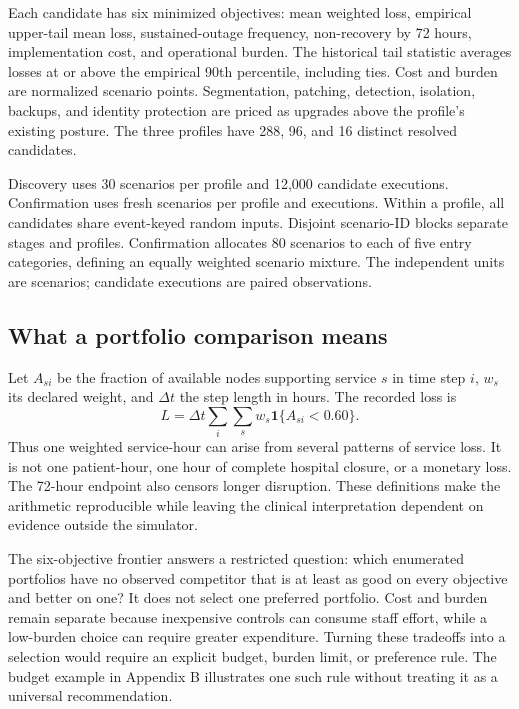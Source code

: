 \documentclass[conference,compsoc]{IEEEtran}
\begin{document}
Each candidate has six minimized objectives: mean weighted loss, empirical
upper-tail mean loss, sustained-outage frequency, non-recovery by 72 hours,
implementation cost, and operational burden. The historical tail statistic
averages losses at or above the empirical 90th percentile, including ties.
Cost and burden are normalized scenario points. Segmentation, patching,
detection, isolation, backups, and identity protection are priced as upgrades
above the profile's existing posture. The three profiles have 288, 96,
and 16 distinct resolved candidates.

Discovery uses 30 scenarios per profile and 12,000 candidate executions.
Confirmation uses \RevisionScenarios{} fresh scenarios per profile and
\RevisionExecutions{} executions. Within a profile, all candidates share
event-keyed random inputs. Disjoint scenario-ID blocks separate stages and
profiles. Confirmation allocates 80 scenarios to each of five entry
categories, defining an equally weighted scenario mixture. The independent
units are scenarios; candidate executions are paired observations.

\subsection{What a portfolio comparison means}
Let $A_{si}$ be the fraction of available nodes supporting service $s$ in
time step $i$, $w_s$ its declared weight, and $\Delta t$ the step length in
hours. The recorded loss is
\begin{equation}
 L=\Delta t\sum_i\sum_s w_s\mathbf{1}\{A_{si}<0.60\}.
 \label{eq:loss}
\end{equation}
Thus one weighted service-hour can arise from several patterns of service
loss. It is not one patient-hour, one hour of complete hospital closure, or
a monetary loss. The 72-hour endpoint also censors longer disruption.
These definitions make the arithmetic reproducible while leaving the
clinical interpretation dependent on evidence outside the simulator.

The six-objective frontier answers a restricted question: which enumerated
portfolios have no observed competitor that is at least as good on every
objective and better on one? It does not select one preferred portfolio.
Cost and burden remain separate because inexpensive controls can consume
staff effort, while a low-burden choice can require greater expenditure.
Turning these tradeoffs into a selection would require an explicit budget,
burden limit, or preference rule. The budget example in Appendix B illustrates
one such rule without treating it as a universal recommendation.
\end{document}
